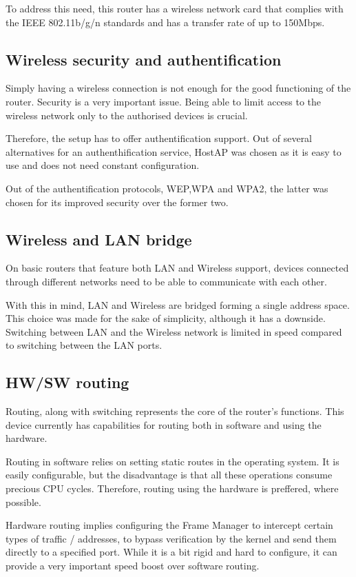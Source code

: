 To address this need, this router has a wireless network card that complies
with the IEEE 802.11b/g/n standards and has a transfer rate of up to
150Mbps.

\subsection{Wireless security and authentification}
\label{sub-sec:wireless-sec}
Simply having a wireless connection is not enough for the good
functioning of the router. Security is a very important issue.
Being able to limit access to the wireless network only to the
authorised devices is crucial.

Therefore, the setup has to offer authentification support. Out of
several alternatives for an authenthification service,
HostAP was chosen as it is easy to use and does not need constant
configuration.

Out of the authentification protocols, WEP,WPA and WPA2, the latter was chosen
for its improved security over the former two.

\subsection{Wireless and LAN bridge}
\label{sub-sec:bridging}
On basic routers that feature both LAN and Wireless support, devices
connected through different networks need to be able to communicate with
each other.

With this in mind, LAN and Wireless are bridged forming a single address space.
This choice was made for the sake of simplicity, although it has a downside.
Switching between LAN and the Wireless network is limited in speed compared 
to switching between the LAN ports.

\subsection{HW/SW routing}
\label{sub-sec:routing}
Routing, along with switching represents the core of the router's functions. 
This device currently has capabilities for routing both in software
and using the hardware.

Routing in software relies on setting static routes in the operating system.
It is easily configurable, but the disadvantage is that all these operations
consume precious CPU cycles. Therefore, routing using the hardware is
preffered, where possible.

Hardware routing implies configuring the Frame Manager to intercept
certain types of traffic / addresses, to bypass verification by the kernel 
and send them directly to a specified port. While it is a bit rigid and
hard to configure, it can provide a very important speed boost over software
routing.

